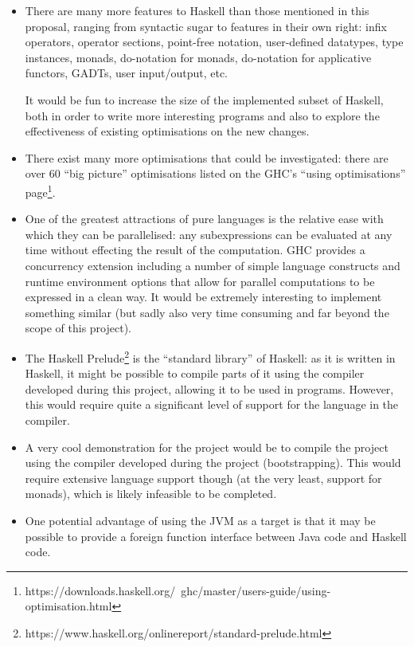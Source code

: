 \documentclass[12pt]{article}
\begin{document}
\begin{itemize}
\item
{
    There are many more features to Haskell than those mentioned in this proposal, ranging from syntactic sugar to
    features in their own right: infix operators, operator sections, point-free notation, user-defined datatypes, type
    instances, monads, do-notation for monads, do-notation for applicative functors, GADTs, user input/output, etc.

    It would be fun to increase the size of the implemented subset of Haskell, both in order to write more interesting
    programs and also to explore the effectiveness of existing optimisations on the new changes.
}
\item
{
    There exist many more optimisations that could be investigated: there are over 60 ``big picture'' optimisations
    listed on the GHC's ``using optimisations''
    page\footnote{https://downloads.haskell.org/~ghc/master/users-guide/using-optimisation.html}.
}
\item
{
    One of the greatest attractions of pure languages is the relative ease with which they can be parallelised: any
    subexpressions can be evaluated at any time without effecting the result of the computation. GHC provides a
    concurrency extension including a number of simple language constructs and runtime environment options that allow
    for parallel computations to be expressed in a clean way. It would be extremely interesting to implement something
    similar (but sadly also very time consuming and far beyond the scope of this project).
}
\item
{
    The Haskell Prelude\footnote{https://www.haskell.org/onlinereport/standard-prelude.html} is the ``standard library''
    of Haskell: as it is written in Haskell, it might be possible to compile parts of it using the compiler developed
    during this project, allowing it to be used in programs. However, this would require quite a significant level of
    support for the language in the compiler.
}
\item
{
    A very cool demonstration for the project would be to compile the project using the compiler developed during the
    project (bootstrapping). This would require extensive language support though (at the very least, support for
    monads), which is likely infeasible to be completed.
}
\item
{
    One potential advantage of using the JVM as a target is that it may be possible to provide a foreign function
    interface between Java code and Haskell code.
}
\end{itemize}
\end{document}
